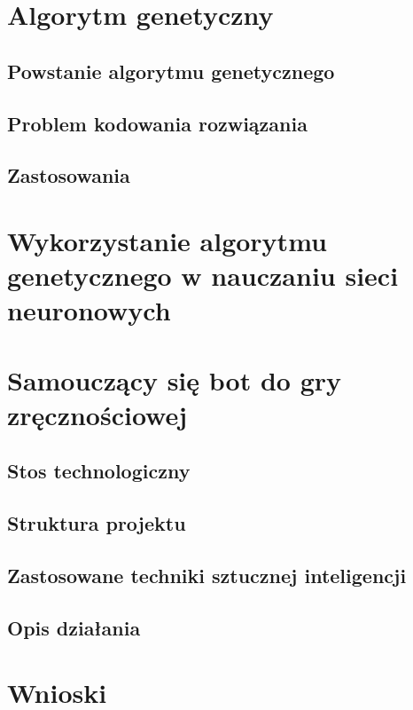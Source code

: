 \documentclass[12pt, oneside]{report}
\begin{document}

\chapter{Algorytm genetyczny}
\section{Powstanie algorytmu genetycznego}
\section{Problem kodowania rozwiązania}
\section{Zastosowania}


\chapter{Wykorzystanie algorytmu genetycznego w nauczaniu sieci neuronowych}


\chapter{Samouczący się bot do gry zręcznościowej}
\section{Stos technologiczny}
\section{Struktura projektu}
\section{Zastosowane techniki sztucznej inteligencji}\textsl{}
\section{Opis działania}

\chapter{Wnioski}

\pagebreak


\end{document}
